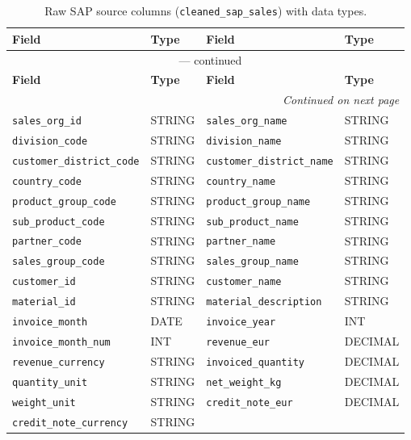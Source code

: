 \documentclass{article}
\begin{document}
\small
\setlength{\tabcolsep}{4pt}
\renewcommand{\arraystretch}{1.1}
\begin{longtable}{@{}l l l l@{}}
\caption{Raw SAP source columns (\texttt{cleaned\_sap\_sales}) with data types.}
\label{tab:sap-schema} \\
\toprule
\textbf{Field} & \textbf{Type} & \textbf{Field} & \textbf{Type} \\
\midrule
\endfirsthead
\multicolumn{4}{c}{\tablename\ \thetable{} --- continued} \\
\toprule
\textbf{Field} & \textbf{Type} & \textbf{Field} & \textbf{Type} \\
\midrule
\endhead
\midrule
\multicolumn{4}{r}{\textit{Continued on next page}} \\
\endfoot
\bottomrule
\endlastfoot
\texttt{sales\_org\_id} & STRING & \texttt{sales\_org\_name} & STRING \\
\texttt{division\_code} & STRING & \texttt{division\_name} & STRING \\
\texttt{customer\_district\_code} & STRING & \texttt{customer\_district\_name} & STRING \\
\texttt{country\_code} & STRING & \texttt{country\_name} & STRING \\
\texttt{product\_group\_code} & STRING & \texttt{product\_group\_name} & STRING \\
\texttt{sub\_product\_code} & STRING & \texttt{sub\_product\_name} & STRING \\
\texttt{partner\_code} & STRING & \texttt{partner\_name} & STRING \\
\texttt{sales\_group\_code} & STRING & \texttt{sales\_group\_name} & STRING \\
\texttt{customer\_id} & STRING & \texttt{customer\_name} & STRING \\
\texttt{material\_id} & STRING & \texttt{material\_description} & STRING \\
\texttt{invoice\_month} & DATE & \texttt{invoice\_year} & INT \\
\texttt{invoice\_month\_num} & INT & \texttt{revenue\_eur} & DECIMAL \\
\texttt{revenue\_currency} & STRING & \texttt{invoiced\_quantity} & DECIMAL \\
\texttt{quantity\_unit} & STRING & \texttt{net\_weight\_kg} & DECIMAL \\
\texttt{weight\_unit} & STRING & \texttt{credit\_note\_eur} & DECIMAL \\
\texttt{credit\_note\_currency} & STRING &  &  \\
\end{longtable}
\normalsize
\end{document}
